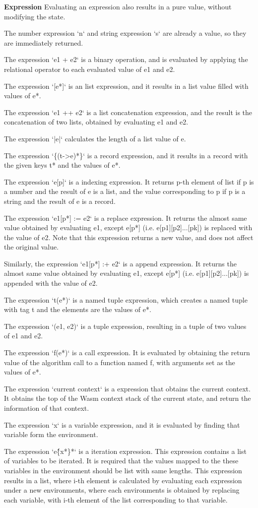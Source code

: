 \textbf{Expression}
Evaluating an expression also results in a pure value, without modifying the state.

The number expression `n` and string expression `s` are already a value, so they are immediately returned.

The expression `e1 + e2` is a binary operation, and is evaluated
by applying the relational operator to each evaluated value of e1 and e2.

The expression `[e*]` is an list expression, and it results in a list value
filled with values of e*.

The expression `e1 ++ e2` is a list concatenation expression, and the result is
the concatenation of two lists, obtained by evaluating e1 and e2.

The expression `|e|` calculates the length of a list value of e.

The expression `\{(t->e)*\}` is a record expression, and it results in a record
with the given keys t* and the values of e*.

The expression `e[p]` is a indexing expression. It returns p-th element of list if p is a number and
the result of e is a list, and the value corresponding to p if p is a string and the result of e is a record.

The expression `e1[p*] := e2` is a replace expression. It returns the almost same value
obtained by evaluating e1, except e[p*] (i.e. e[p1][p2]...[pk]) is replaced with the value of e2.
Note that this expression returns a new value, and does not affect the original value.

Similarly, the expression `e1[p*] :+ e2` is a append expression. It returns the almost same value
obtained by evaluating e1, except e[p*] (i.e. e[p1][p2]...[pk]) is appended with the value of e2.

The expression `t(e*)` is a named tuple expression, which creates a named tuple with tag t and
the elements are the values of e*.

The expression `(e1, e2)` is a tuple expression, resulting in a tuple of two values of e1 and e2.

The expression `f(e*)` is a call expression. It is evaluated by obtaining the return value
of the algorithm call to a function named f, with arguments set as the values of e*.

The expression `current context` is a expression that obtains the current context. It obtains the
top of the Wasm context stack of the current state, and return the information of that context.

The expression `x` is a variable expression, and it is evaluated by finding that variable form the
environment.

The expression `e\^\{x*\}*` is a iteration expression. This expression contains a
list of variables to be iterated. It is required that the values mapped to the these variables
in the environment should be list with same lengths.
This expression results in a list,
where i-th element is calculated by evaluating each expression under a new environments,
where each environments is obtained by replacing each variable, with i-th element of the
list corresponding to that variable.

